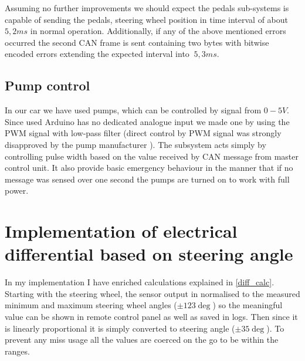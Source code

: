 Assuming no further improvements we should expect the pedals sub-systems is capable of sending the pedals, steering wheel position in time interval of about $5,2ms$ in normal operation.
Additionally, if any of the above mentioned errors occurred the second CAN frame is sent containing two bytes with bitwise encoded errors extending the expected interval into $~5,3ms$.

\subsection{Pump control}
In our car we have used  pumps, which can be controlled by signal from $0-5V$. Since used Arduino has no dedicated analogue input we made one by using the PWM signal with low-pass filter (direct control by PWM signal was strongly disapproved by the pump manufacturer ).
The subsystem acts simply by controlling pulse width based on the value received by CAN message from master control unit. It also provide basic emergency behaviour in the manner that if no message was sensed over one second the pumps are turned on to work with full power.






\section{Implementation of electrical differential based on steering angle}
In my implementation I have enriched calculations explained in \ref{diff_calc}. Starting with the steering wheel, the sensor output in normalised to the measured minimum and maximum steering wheel angles ($\pm123\deg$) so the meaningful value can be shown in remote control panel as well as saved in logs. 
Then since it is linearly proportional it is simply converted to steering angle ($\pm35\deg$). To prevent any miss usage all the values are coerced on the go to be within the ranges.

